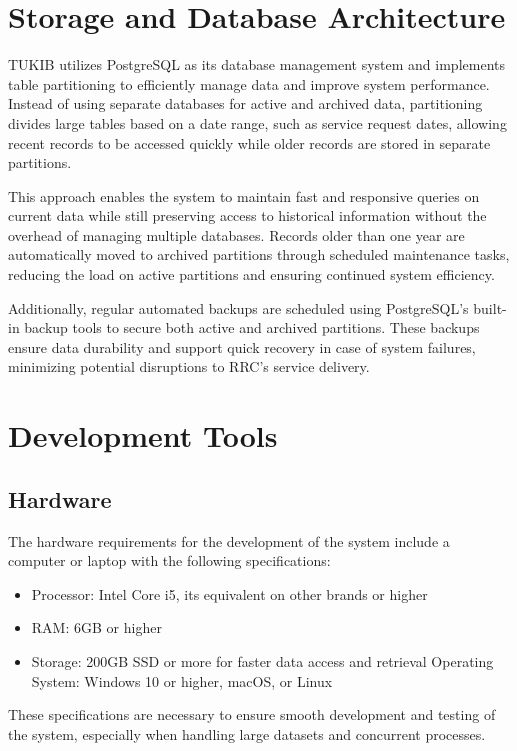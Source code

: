 \section{Storage and Database Architecture}

TUKIB utilizes PostgreSQL as its database management system and implements table partitioning to efficiently manage data and improve system performance. Instead of using separate databases for active and archived data, partitioning divides large tables based on a date range, such as service request dates, allowing recent records to be accessed quickly while older records are stored in separate partitions.

This approach enables the system to maintain fast and responsive queries on current data while still preserving access to historical information without the overhead of managing multiple databases. Records older than one year are automatically moved to archived partitions through scheduled maintenance tasks, reducing the load on active partitions and ensuring continued system efficiency.

Additionally, regular automated backups are scheduled using PostgreSQL’s built-in backup tools to secure both active and archived partitions. These backups ensure data durability and support quick recovery in case of system failures, minimizing potential disruptions to RRC’s service delivery.

\section{Development Tools}

\subsection{Hardware}

The hardware requirements for the development of the system include a computer or laptop with the following specifications:

\begin{itemize}
	\item Processor: Intel Core i5, its equivalent on other brands or higher
	\item RAM: 6GB or higher
	\item Storage: 200GB SSD or more for faster data access and retrieval
	Operating System: Windows 10 or higher, macOS, or Linux
\end{itemize}

These specifications are necessary to ensure smooth development and testing of the system, especially when handling large datasets and concurrent processes.

